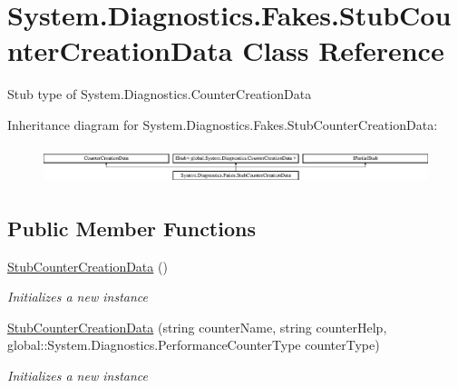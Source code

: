\hypertarget{class_system_1_1_diagnostics_1_1_fakes_1_1_stub_counter_creation_data}{\section{System.\-Diagnostics.\-Fakes.\-Stub\-Counter\-Creation\-Data Class Reference}
\label{class_system_1_1_diagnostics_1_1_fakes_1_1_stub_counter_creation_data}
}


Stub type of System.\-Diagnostics.\-Counter\-Creation\-Data 


Inheritance diagram for System.\-Diagnostics.\-Fakes.\-Stub\-Counter\-Creation\-Data\-:\begin{figure}[H]
\begin{center}
\leavevmode
\includegraphics[height=1.091618cm]{class_system_1_1_diagnostics_1_1_fakes_1_1_stub_counter_creation_data}
\end{center}
\end{figure}
\subsection*{Public Member Functions}
\begin{DoxyCompactItemize}
\item 
\hyperlink{class_system_1_1_diagnostics_1_1_fakes_1_1_stub_counter_creation_data_aad05ba03701309c85cfd22e1aff5f7e0}{Stub\-Counter\-Creation\-Data} ()
\begin{DoxyCompactList}\small\item\em Initializes a new instance\end{DoxyCompactList}\item 
\hyperlink{class_system_1_1_diagnostics_1_1_fakes_1_1_stub_counter_creation_data_a136d45369426aa697d8819699a708cee}{Stub\-Counter\-Creation\-Data} (string counter\-Name, string counter\-Help, global\-::\-System.\-Diagnostics.\-Performance\-Counter\-Type counter\-Type)
\begin{DoxyCompactList}\small\item\em Initializes a new instance\end{DoxyCompactList}\end{DoxyCompactItemize}
